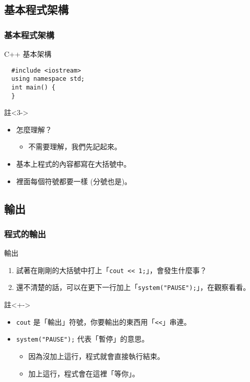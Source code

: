 \documentclass[utf8]{beamer}
\begin{document}
\begin{CJK}{UTF8}{bkai}
\subsection{基本程式架構}

\begin{frame}[fragile]
  \frametitle{基本程式架構}
  \begin{block}{C++ 基本架構}
    \pause
    \begin{lstlisting}
  #include <iostream>
  using namespace std;
  int main() {
  }
    \end{lstlisting}
  \end{block}
  \begin{exampleblock}{註}<3->
    \begin{itemize}
    \item 怎麼理解？
      \begin{itemize}[<4->]
      \item 不需要理解，我們先記起來。
      \end{itemize}
    \item<5-> 基本上程式的內容都寫在\alert{大括號}中。
    \item<6-> 裡面每個符號都要一樣 (分號也是)。
    \end{itemize}
  \end{exampleblock}
\end{frame}

\subsection{輸出}

\begin{frame}[fragile]
  \frametitle{程式的輸出}
  \begin{block}{輸出}
    \begin{enumerate}[<+->]
      \item 試著在剛剛的大括號中打上「\lstinline{cout << 1;}{}」，會發生什麼事？
      \item 還不清楚的話，可以在更下一行加上「\lstinline{system("PAUSE");}{}」，在觀察看看。
    \end{enumerate}
  \end{block}
  \begin{exampleblock}{註}<+->
    \begin{itemize}
    \item \lstinline{cout}{} 是「輸出」符號，你要輸出的東西用「\lstinline{<<}{}」串連。
    \item<+-> \lstinline{system("PAUSE");}{} 代表「暫停」的意思。
      \begin{itemize}[<+->]
      \item 因為沒加上這行，程式就會直接執行結束。
      \item 加上這行，程式會在這裡「等你」。
      \end{itemize}
    \end{itemize}
  \end{exampleblock}
\end{frame}


\end{CJK}
\end{document}
